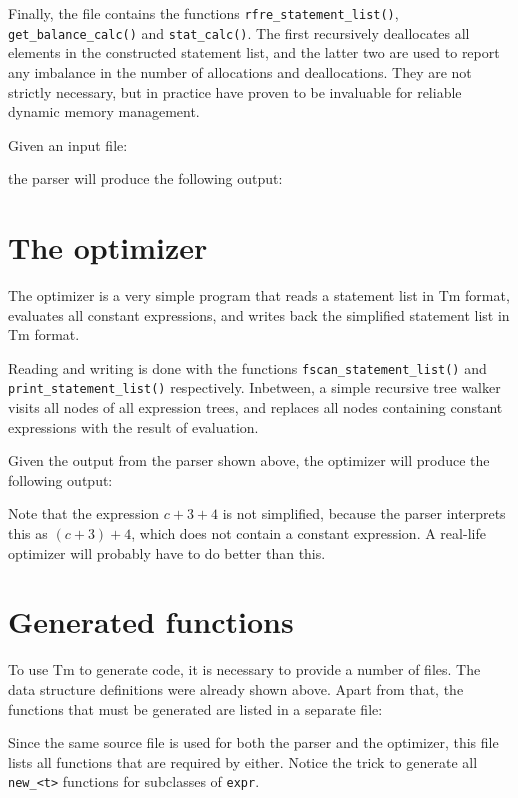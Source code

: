 \begin{sloppypar}
Finally, the file contains the functions \verb'rfre_statement_list()',
\verb'get_balance_calc()' and \verb'stat_calc()'. The first recursively
deallocates all elements in the constructed statement list, and the latter
two are used to report any imbalance in the number of allocations and
deallocations. They are not strictly necessary, but in practice have
proven to be invaluable for reliable dynamic memory management.
\end{sloppypar}
\par
Given an input file:
\begin{showfile}
\end{showfile}
the parser will produce the following output:
\begin{showfile}
\end{showfile}
\section{The optimizer}
The optimizer is a very simple program that reads a statement list
in Tm format, evaluates all constant expressions, and writes back the
simplified statement list in Tm format.
\begin{showfile}
\end{showfile}
\begin{sloppypar}
Reading and writing is done with the functions
\verb'fscan_statement_list()' and \verb'print_statement_list()'
respectively. Inbetween, a simple recursive tree walker visits all nodes
of all expression trees, and replaces all nodes containing constant
expressions with the result of evaluation.
\end{sloppypar}

Given the output from the parser shown above, the optimizer will produce
the following output:
\begin{showfile}
\end{showfile}
Note that the expression $c+3+4$ is not simplified, because the parser
interprets this as $(c+3)+4$, which does not contain a constant
expression. A real-life optimizer will probably have to do better
than this.
\section{Generated functions}
To use Tm to generate code, it is necessary to provide a
number of files. The data structure definitions were already shown above.
Apart from that, the functions that must be generated are listed in a
separate file:
\begin{showfile}
\end{showfile}
Since the same source file is used for both the parser and the
optimizer, this file lists all functions that are required by either.
Notice the trick to generate all \verb'new_<t>' functions for subclasses
of {\tt expr}.

